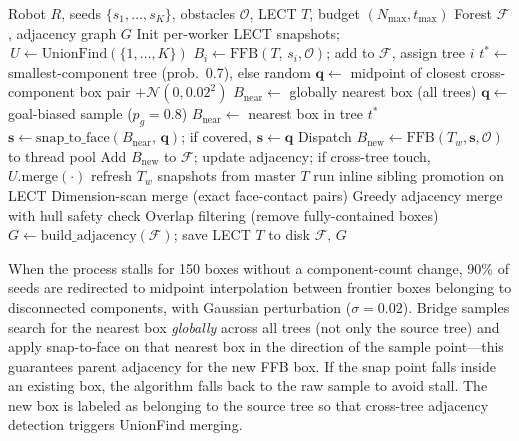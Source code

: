\documentclass[journal]{IEEEtran}
\begin{document}
\begin{algorithm}[t]
\caption{Coordinated Multi-Tree Forest Construction}\label{alg:build}
\footnotesize
\begin{algorithmic}[1]
\REQUIRE Robot $R$, seeds $\{s_1,\ldots,s_K\}$, obstacles $\mathcal{O}$,
  LECT $T$, budget $(N_{\max}, t_{\max})$
\ENSURE Forest $\mathcal{F}$, adjacency graph $G$
\STATE Init per-worker LECT snapshots; $\,U \leftarrow \text{UnionFind}(\{1,\ldots,K\})$
  \STATE $B_i \leftarrow \text{FFB}(T,\,s_i,\mathcal{O})$; add to $\mathcal{F}$, assign tree $i$
\ENDFOR
{}
  \STATE $t^* \leftarrow$ smallest-component tree (prob.\ 0.7), else random
    \STATE $\bm{q} \leftarrow$ midpoint of closest cross-component box pair
      $+ \mathcal{N}(0, 0.02^2)$
    \STATE $B_{\text{near}} \leftarrow$ globally nearest box (all trees)
  \ELSE
    \STATE $\bm{q} \leftarrow$ goal-biased sample ($p_g{=}0.8$)
    \STATE $B_{\text{near}} \leftarrow$ nearest box in tree $t^*$
  \ENDIF
  \STATE $\bm{s} \leftarrow \text{snap\_to\_face}(B_{\text{near}},\, \bm{q})$; if covered, $\bm{s} \leftarrow \bm{q}$
  \STATE Dispatch $B_{\text{new}} \leftarrow \text{FFB}(T_w, \bm{s}, \mathcal{O})$ to thread pool
    \STATE Add $B_{\text{new}}$ to $\mathcal{F}$; update adjacency;
      if cross-tree touch, $U.\text{merge}(\cdot)$
  \ENDIF
    \STATE refresh $T_w$ snapshots from master $T$
  \ENDIF
    \STATE run inline sibling promotion on LECT
  \ENDIF
\ENDWHILE
\STATE {}
\STATE Dimension-scan merge (exact face-contact pairs)
\STATE Greedy adjacency merge with hull safety check
  \hfill{}
\STATE Overlap filtering (remove fully-contained boxes)
\STATE $G \leftarrow \mathrm{build\_adjacency}(\mathcal{F})$;
  save LECT $T$ to disk
\RETURN $\mathcal{F},\, G$
\end{algorithmic}
\end{algorithm}
When the process stalls for 150 boxes without a component-count change,
90\% of seeds are redirected to midpoint interpolation between frontier
boxes belonging to disconnected components, with Gaussian perturbation
($\sigma = 0.02$).
Bridge samples search for the nearest box \emph{globally} across all
trees (not only the source tree) and apply snap-to-face on that nearest
box in the direction of the sample point---this guarantees parent
adjacency for the new FFB box.
If the snap point falls inside an existing box, the algorithm falls back
to the raw sample to avoid stall.
The new box is labeled as belonging to the source tree so that
cross-tree adjacency detection triggers UnionFind merging.
\end{document}
